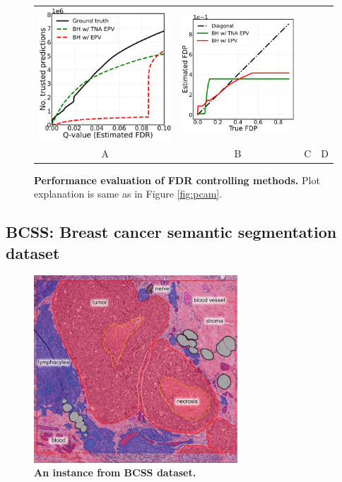 \documentclass{article}
\begin{document}
\begin{figure}[h!]
\begin{tabular}{cccc}
		\includegraphics[width=2in]{img/cnn_multi_sa_bcss_fdr_control_loc.png}  &
		\includegraphics[width=1.7in]{img/cnn_FDPscat_sa_bcss.png}\\	
		A & B & C & D
	\end{tabular}
	\caption{{\bf Performance evaluation of FDR controlling methods.} Plot explanation is same as in Figure \ref{fig:pcam}. }
	\label{fig:ii}
\end{figure} 




\subsection{BCSS: Breast cancer semantic segmentation dataset}

\begin{figure}[h]
	\centering
	\includegraphics[width=3in]{img/bcss_instance.jpeg}
	\caption{{\bf An instance from BCSS dataset.}}
	\label{fig:bcss_example}
\end{figure} 
\end{document}
